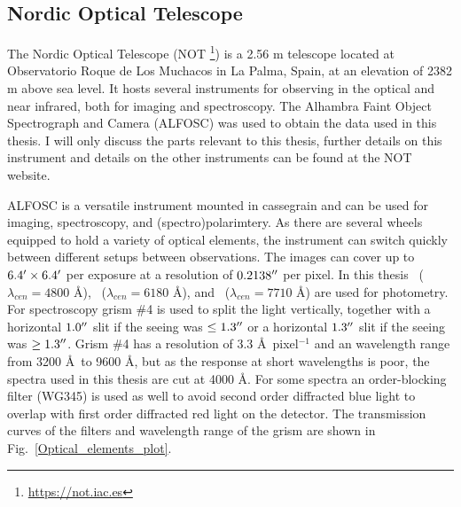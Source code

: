 \documentclass[a4paper,oneside,12pt, class=Latex/Classes/PhDthesisPSnPDF, crop=false]{standalone}
\begin{document}
\subsection{Nordic Optical Telescope}
The Nordic Optical Telescope (NOT \footnote{\url{https://not.iac.es}}) is a 2.56 m telescope located at Observatorio Roque de Los Muchacos in La Palma, Spain, at an elevation of 2382 m above sea level. It hosts several instruments for observing in the optical and near infrared, both for imaging and spectroscopy. The Alhambra Faint Object Spectrograph and Camera (ALFOSC) was used to obtain the data used in this thesis. I will only discuss the parts relevant to this thesis, further details on this instrument and  details on the other instruments can be found at the NOT website.

ALFOSC is a versatile instrument mounted in cassegrain and can be used for imaging, spectroscopy, and (spectro)polarimtery. As there are several wheels equipped to hold a variety of optical elements, the instrument can switch quickly between different setups between observations. The images can cover up to $6.4^{\prime}\times6.4^{\prime}$ per exposure at a resolution of $0.2138^{\prime\prime}$ per pixel. In this thesis \ztfg~($\lambda_{cen} = 4800$ \AA), \ztfr~($\lambda_{cen} = 6180$ \AA), and \ztfi~($\lambda_{cen} = 7710$ \AA) are used for photometry. For spectroscopy grism \#4 is used to split the light vertically, together with a horizontal $1.0^{\prime\prime}$ slit if the seeing was $\leq1.3^{\prime\prime}$ or a horizontal $1.3^{\prime\prime}$ slit if the seeing was $\geq1.3^{\prime\prime}$. Grism \#4 has a resolution of 3.3 \AA\ pixel$^{-1}$ and an wavelength range from 3200 \AA\ to 9600 \AA, but as the response at short wavelengths is poor, the spectra used in this thesis are cut at 4000 \AA. For some spectra an order-blocking filter (WG345) is used as well to avoid second order diffracted blue light to overlap with first order diffracted red light on the detector. The transmission curves of the filters and wavelength range of the grism are shown in Fig.~\ref{Optical_elements_plot}.
\end{document}
